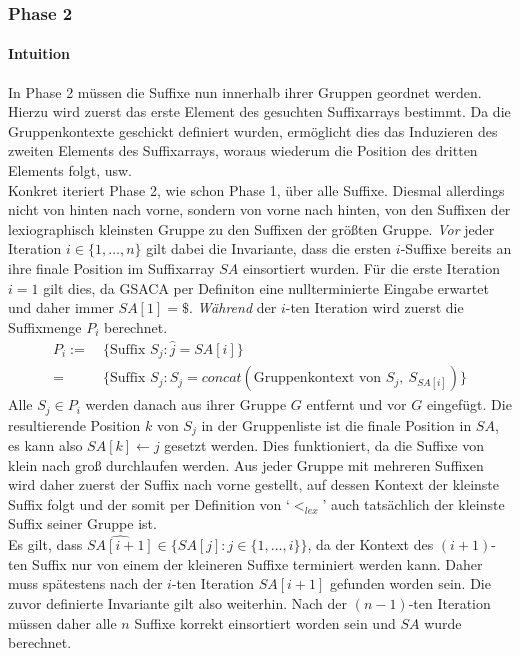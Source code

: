 \documentclass[twoside,11pt]{article}
\theoremstyle{break}
\begin{document}
\subsubsection{Phase 2}

\paragraph{Intuition} In Phase 2 müssen die Suffixe nun innerhalb ihrer Gruppen geordnet werden. Hierzu wird zuerst das erste Element des gesuchten Suffixarrays bestimmt. Da die Gruppenkontexte geschickt definiert wurden, ermöglicht dies das Induzieren des zweiten Elements des Suffixarrays, woraus wiederum die Position des dritten Elements folgt, usw. \\

Konkret iteriert Phase 2, wie schon Phase 1, über alle Suffixe. Diesmal allerdings nicht von hinten nach vorne, sondern von vorne nach hinten, von den Suffixen der lexiographisch kleinsten Gruppe zu den Suffixen der größten Gruppe. \textit{Vor} jeder Iteration $i \in \{ 1, \dots, n \}$ gilt dabei die Invariante, dass die ersten $i$-Suffixe bereits an ihre finale Position im Suffixarray $SA$ einsortiert wurden. Für die erste Iteration $i = 1$ gilt dies, da GSACA per Definiton eine nullterminierte Eingabe erwartet und daher immer $SA[1] = \$$. \textit{Während} der $i$-ten Iteration wird zuerst die Suffixmenge $P_i$ berechnet.
\begin{align*}
	P_i :=\ & \{ \text{Suffix } S_j: \widehat{j} = SA[i] \} \\
	=\ & \{ \text{Suffix } S_j: S_j = concat(\text{Gruppenkontext von } S_j,\ S_{SA[i]}) \}
\end{align*}
Alle $S_j \in P_i$ werden danach aus ihrer Gruppe $G$ entfernt und vor $G$ eingefügt. Die resultierende Position $k$ von $S_j$ in der Gruppenliste ist die finale Position in $SA$, es kann also $SA[k] \leftarrow j$ gesetzt werden. Dies funktioniert, da die Suffixe von klein nach groß durchlaufen werden. Aus jeder Gruppe mit mehreren Suffixen wird daher zuerst der Suffix nach vorne gestellt, auf dessen Kontext der kleinste Suffix folgt und der somit per Definition von `$<_{lex}$' auch tatsächlich der kleinste Suffix seiner Gruppe ist. \\

Es gilt, dass $\widehat{SA[i + 1]} \in \{ SA[j]: j \in \{ 1, \dots, i \} \}$, da der Kontext des $(i + 1)$-ten Suffix nur von einem der kleineren Suffixe terminiert werden kann. Daher muss spätestens nach der $i$-ten Iteration $SA[i + 1]$ gefunden worden sein. Die zuvor definierte Invariante gilt also weiterhin. Nach der $(n - 1)$-ten Iteration müssen daher alle $n$ Suffixe korrekt einsortiert worden sein und $SA$ wurde berechnet.
\end{document}
